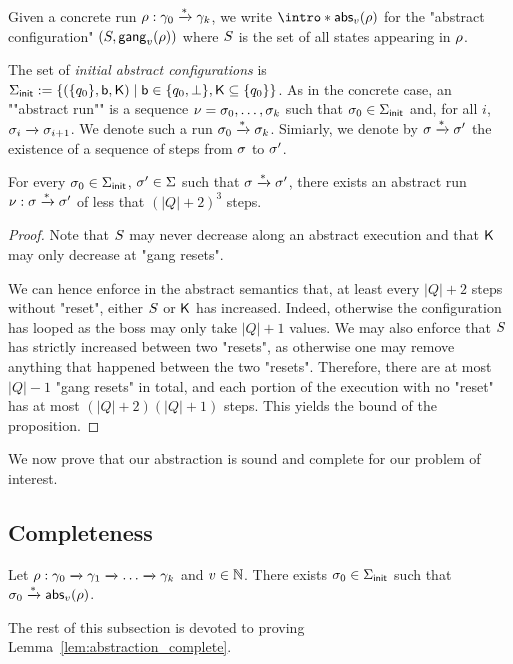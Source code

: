 \begin{definition}
Given a concrete run $\rho: \gamma_0 \xrightarrow{*} \gamma_k$, we write \AP  $\intro*\absproj{\aval}{\run}$ for the "abstract configuration" $(S, \mathsf{gang}_{v}(\rho))$ where $S$ is the set of all states appearing in $\rho$. 

The set of \emph{initial abstract configurations} is $\Sigma_{\mathsf{init}} := \{(\{q_0\}, \mathsf{b}, \mathsf{K})  \mid \mathsf{b} \in \{q_0, \bot\}, \mathsf{K} \subseteq \{q_0\}\}$.  
As in the concrete case, an ""abstract run"" is a sequence $\nu = \sigma_0, \dots, \sigma_k$ such that $\sigma_0 \in \Sigma_{\mathsf{init}}$ and, for all $i$, $\sigma_i \xrightarrow{} \sigma_{i+1}$. We denote such a run $\sigma_0 \xrightarrow{*} \sigma_k$. Simiarly, we denote by $\sigma \xrightarrow{*} \sigma'$ the existence of a sequence of steps from $\sigma$ to $\sigma'$.
\end{definition}


\begin{proposition}
For every $\sigma_0 \in \Sigma_{\mathsf{init}}$, $\sigma' \in \Sigma$ such that $\sigma \xrightarrow{*} \sigma'$, there exists an abstract run $\nu: \sigma \xrightarrow{*} \sigma'$ of less that $(|Q|+2)^3$ steps.
\end{proposition}
\begin{proof}
Note that $S$ may never decrease along an abstract execution and that $\mathsf{K}$ may only decrease at "gang resets".

We can hence enforce in the abstract semantics that, at least every $|Q|+2$ steps without "reset", either $S$ or $\mathsf{K}$ has increased. Indeed, otherwise the configuration has looped as the boss may only take $|Q| +1$ values. We may also enforce that $S$ has strictly increased between two "resets", as otherwise one may remove anything that happened between the two "resets". Therefore, there are at most $|Q|-1$ "gang resets" in total, and each portion of the execution with no "reset" has at most $(|Q|+2)(|Q|+1)$ steps. This yields the bound of the proposition. 
\end{proof}

We now prove that our abstraction is sound and complete for our problem of interest. 

\subsection{Completeness}

\begin{lemma}
\label{lem:abstraction_complete}
Let $\rho: \gamma_0 \xrightarrow{} \gamma_1 \xrightarrow{} \dots \xrightarrow{} \gamma_k$ and $v \in \mathbb{N}$. There exists $\sigma_0 \in \Sigma_{\mathsf{init}}$ such that $\sigma_0 \xrightarrow{*} \mathsf{abs}_{v}(\rho)$. 
\end{lemma}
The rest of this subsection is devoted to proving Lemma~\ref{lem:abstraction_complete}.

